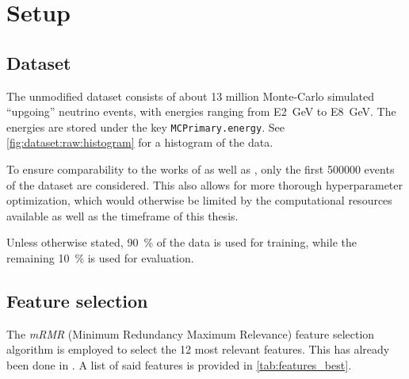 \section{Setup}

\subsection{Dataset}
The unmodified dataset \cite{icecube_mc} consists of about 13 million Monte-Carlo simulated \enquote{upgoing} neutrino events,
with energies ranging from \SI{E2}{\giga\electronvolt} to \SI{E8}{\giga\electronvolt}.
The energies are stored under the key \texttt{MCPrimary.energy}. %
See \autoref{fig:dataset:raw:histogram} for a histogram of the data.

To ensure comparability to the works of \citeauthor{dsea_samuel} as well as \citeauthor{dsea_jan},
only the first \num{500000} events of the dataset are considered.
This also allows for more thorough hyperparameter optimization,
which would otherwise be limited by the computational resources available as well as the timeframe of this thesis.

Unless otherwise stated,
\SI{90}{\percent} of the data is used for training,
while the remaining \SI{10}{\percent} is used for evaluation.


\subsection{Feature selection}
The \emph{mRMR} (Minimum Redundancy Maximum Relevance) feature selection algorithm \cite{mrmr} is employed to select the 12 most relevant features.
This has already been done in \cite{dsea_jan}.
A list of said features is provided in \autoref{tab:features_best}.

